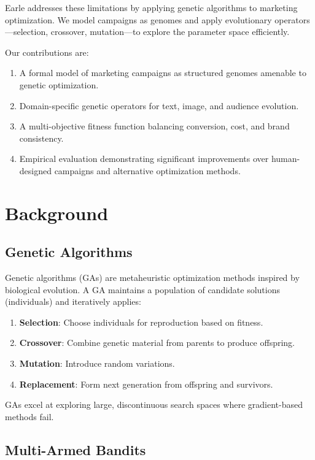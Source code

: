 \documentclass[11pt,twocolumn]{article}
\begin{document}
Earle addresses these limitations by applying genetic algorithms to marketing optimization. We model campaigns as genomes and apply evolutionary operators—selection, crossover, mutation—to explore the parameter space efficiently.

Our contributions are:
\begin{enumerate}
\item A formal model of marketing campaigns as structured genomes amenable to genetic optimization.
\item Domain-specific genetic operators for text, image, and audience evolution.
\item A multi-objective fitness function balancing conversion, cost, and brand consistency.
\item Empirical evaluation demonstrating significant improvements over human-designed campaigns and alternative optimization methods.
\end{enumerate}

\section{Background}

\subsection{Genetic Algorithms}

Genetic algorithms (GAs) \cite{holland1975} are metaheuristic optimization methods inspired by biological evolution. A GA maintains a population of candidate solutions (individuals) and iteratively applies:

\begin{enumerate}
\item \textbf{Selection}: Choose individuals for reproduction based on fitness.
\item \textbf{Crossover}: Combine genetic material from parents to produce offspring.
\item \textbf{Mutation}: Introduce random variations.
\item \textbf{Replacement}: Form next generation from offspring and survivors.
\end{enumerate}

GAs excel at exploring large, discontinuous search spaces where gradient-based methods fail.

\subsection{Multi-Armed Bandits}
\end{document}
